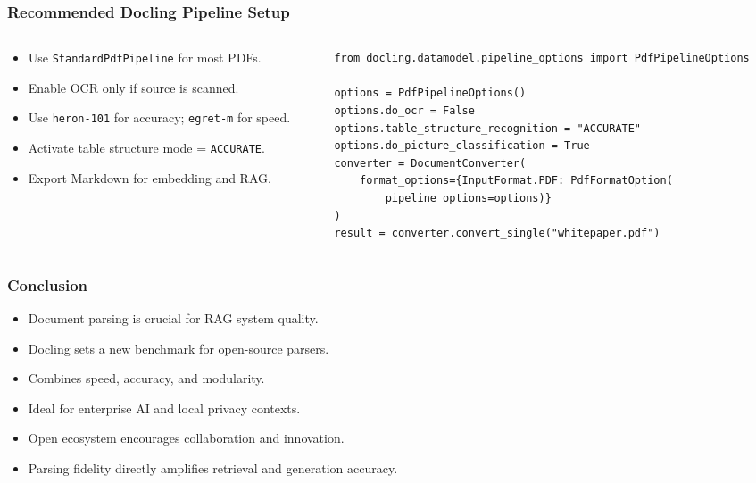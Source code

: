 \begin{frame}[fragile]\frametitle{Recommended Docling Pipeline Setup}
\begin{columns}
    \begin{column}[T]{0.5\linewidth}
      \begin{itemize}
        \item Use \texttt{StandardPdfPipeline} for most PDFs.
        \item Enable OCR only if source is scanned.
        \item Use \texttt{heron-101} for accuracy; \texttt{egret-m} for speed.
        \item Activate table structure mode = \texttt{ACCURATE}.
        \item Export Markdown for embedding and RAG.
      \end{itemize}
    \end{column}
    \begin{column}[T]{0.5\linewidth}
      \begin{lstlisting}
from docling.datamodel.pipeline_options import PdfPipelineOptions

options = PdfPipelineOptions()
options.do_ocr = False
options.table_structure_recognition = "ACCURATE"
options.do_picture_classification = True
converter = DocumentConverter(
    format_options={InputFormat.PDF: PdfFormatOption(
        pipeline_options=options)}
)
result = converter.convert_single("whitepaper.pdf")
      \end{lstlisting}
    \end{column}
  \end{columns}
\end{frame}

\begin{frame}[fragile]\frametitle{Conclusion}
      \begin{itemize}
        \item Document parsing is crucial for RAG system quality.
        \item Docling sets a new benchmark for open-source parsers.
        \item Combines speed, accuracy, and modularity.
        \item Ideal for enterprise AI and local privacy contexts.
        \item Open ecosystem encourages collaboration and innovation.
        \item Parsing fidelity directly amplifies retrieval and generation accuracy.
      \end{itemize}
\end{frame}

